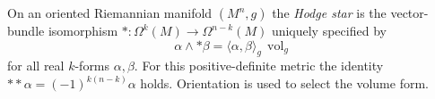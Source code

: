 
On an oriented Riemannian manifold $(M^n,g)$ the \emph{Hodge star} is the vector-bundle isomorphism $*:\Omega^k(M)\to\Omega^{n-k}(M)$ uniquely specified by
\[
\alpha\wedge*\beta=\langle\alpha,\beta\rangle_g\,\operatorname{vol}_g
\]
for all real $k$-forms $\alpha,\beta$. For this positive-definite metric the identity $**\alpha=(-1)^{k(n-k)}\alpha$ holds. Orientation is used to select the volume form.
